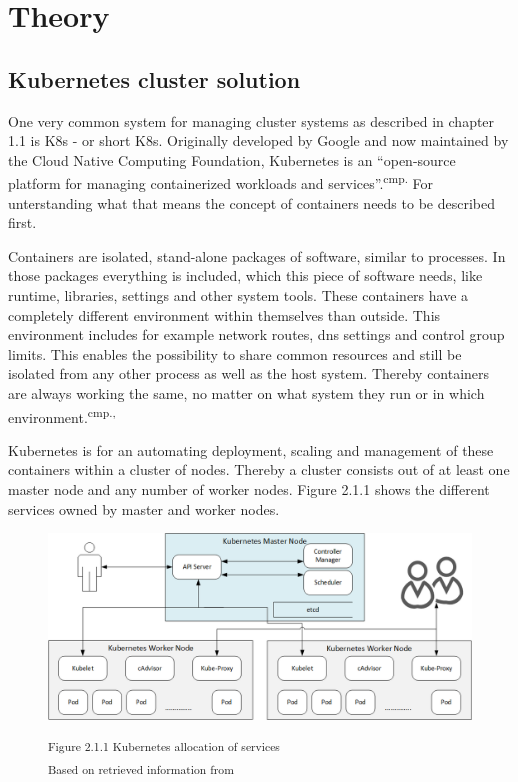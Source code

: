 \chapter{Theory}

\section{Kubernetes cluster solution}

One very common system for managing cluster systems as described in chapter 1.1 is \acl{K8s} - or short \acs{K8s}. Originally developed by Google and now maintained by the Cloud Native Computing Foundation, Kubernetes is an ``open-source platform for managing containerized workloads and services''.\textsuperscript{cmp.\cite{12}} For unterstanding what that means the concept of containers needs to be described first.


Containers are isolated, stand-alone packages of software, similar to processes. In those packages everything is included, which this piece of software needs, like runtime, libraries, settings and other system tools.  These containers have a completely different environment within themselves than outside. This environment includes for example network routes, dns settings and control group limits. This enables the possibility to share common resources and still be isolated from any other process as well as the host system. Thereby containers are always working the same, no matter on what system they run or in which environment.\textsuperscript{cmp.\cite{13}, \cite{14}}


Kubernetes is for an automating deployment, scaling and management of these containers within a cluster of nodes. Thereby a cluster consists out of at least one master node and any number of worker nodes. Figure 2.1.1 shows the different services owned by master and worker nodes.

\begin{figure}[h]
\centering
\includegraphics[width=\textwidth/5*3]{images/kubernetes_service_allocation.png}

\textsuperscript{Figure 2.1.1 Kubernetes allocation of services}\\
\textsuperscript{Based on retrieved information from \cite{13}}
\end{figure}

